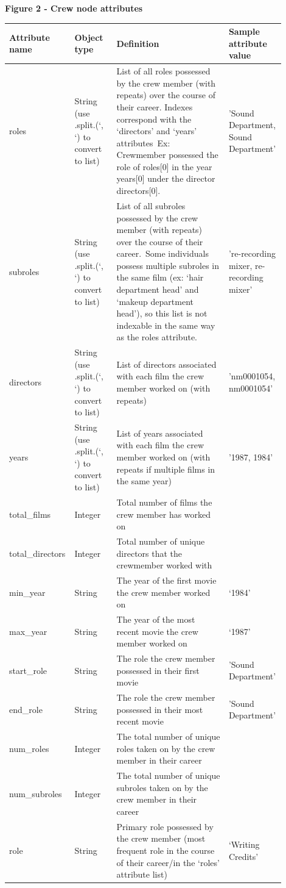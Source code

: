 \documentclass[12pt]{article}
\begin{document}
\begin{table}
\centering
\textbf{Figure 2 - Crew node attributes}
\begin{tabular}{|>{\raggedright\arraybackslash}p{0.15\linewidth}|>{\raggedright\arraybackslash}p{0.15\linewidth}|>{\raggedright\arraybackslash}p{0.4\linewidth}|>{\raggedright\arraybackslash}p{0.2\linewidth}|}
\hline
\textbf{Attribute name}& \textbf{Object type}& \textbf{Definition}& \textbf{Sample attribute value}\\
\hline
roles & String (use .split.(‘, ‘) to convert to list) & List of all roles possessed by the crew member (with repeats) over the course of their career. Indexes correspond with the ‘directors’ and ‘years’ attributes Ex: Crewmember possessed the role of roles[0] in the year years[0] under the director directors[0].  & 'Sound Department, Sound Department' \\
\hline
subroles & String (use .split.(‘, ‘) to convert to list) & List of all subroles possessed by the crew member (with repeats) over the course of their career. Some individuals possess multiple subroles in the same film (ex: ‘hair department head’ and ‘makeup department head’), so this list is not indexable in the same way as the roles attribute.  & 're-recording mixer, re-recording mixer' \\
\hline
directors & String (use .split.(‘, ‘) to convert to list) & List of directors associated with each film the crew member worked on (with repeats) & 'nm0001054, nm0001054' \\
\hline
years & String (use .split.(‘, ‘) to convert to list) & List of years associated with each film the crew member worked on (with repeats if multiple films in the same year) & '1987, 1984' \\
\hline
total\_films & Integer  & Total number of films the crew member has worked on & 2 \\
\hline
total\_directors & Integer  & Total number of unique directors that the crewmember worked with & 1 \\
\hline
min\_year & String & The year of the first movie the crew member worked on & ‘1984’ \\
\hline
max\_year & String  & The year of the most recent movie the crew member worked on & ‘1987’ \\
\hline
start\_role & String  & The role the crew member possessed in their first movie & 'Sound Department' \\
\hline
end\_role & String & The role the crew member possessed in their most recent movie & 'Sound Department' \\
\hline
num\_roles & Integer  & The total number of unique roles taken on by the crew member in their career & 1 \\
\hline
num\_subroles & Integer  & The total number of unique subroles taken on by the crew member in their career & 1 \\
\hline
role & String & Primary role possessed by the crew member (most frequent role in the course of their career/in the ‘roles’ attribute list) & ‘Writing Credits’ \\
\hline
\end{tabular}
\end{table}
\end{document}
